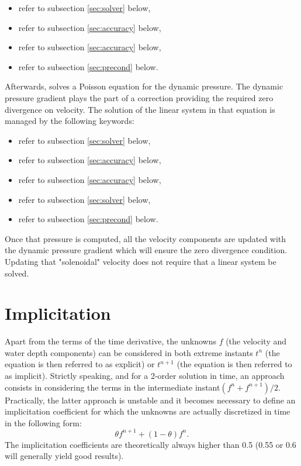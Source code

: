\begin{itemize}
\item {} refer to subsection \ref{sec:solver} below,

\item {} refer to
subsection \ref{sec:accuracy} below,

\item {} refer to subsection \ref{sec:accuracy} below,

\item {} refer to subsection \ref{sec:precond}
below.
\end{itemize}

Afterwards,  solves a Poisson equation for the dynamic pressure. The
dynamic pressure gradient plays the part of a correction providing the required
zero divergence on velocity. The solution of the linear system in that equation
is managed by the following keywords:

\begin{itemize}
\item {} refer to subsection \ref{sec:solver} below,

\item {} refer to subsection \ref{sec:accuracy}
below,

\item {} refer to subsection \ref{sec:accuracy} below,

\item {} refer to subsection \ref{sec:solver} below,

\item {} refer to subsection \ref{sec:precond} below.
\end{itemize}

Once that pressure is computed, all the velocity components are updated with
the dynamic pressure gradient which will ensure the zero divergence condition.
Updating that "solenoidal" velocity does not require that a linear system be
solved.

\section{Implicitation}

Apart from the terms of the time derivative, the unknowns $f$ (the velocity and
water depth components) can be considered in both extreme instants $t^{n}$ (the
equation is then referred to as explicit) or $t^{n+1}$ (the equation is then
referred to as implicit). Strictly speaking, and for a 2-order solution in
time, an approach consists in considering the terms in the intermediate
instant$(f^{n} +f^{n+1})/2$. Practically, the latter approach is unstable and
it becomes necessary to define an implicitation coefficient for which the
unknowns are actually discretized in time in the following form:
\[\theta f^{n+1} +(1-\theta )f^{n} .\]
The implicitation coefficients are theoretically always higher than 0.5 (0.55
or 0.6 will generally yield good results).

